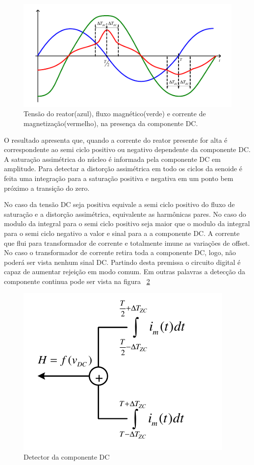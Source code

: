 \documentclass[paper=a4, fontsize=11pt]{article}
\begin{document}
\begin{figure}[!ht]
	\centering
	\includegraphics[scale=.8]{fig2.png}
    \caption{Tensão do reator(azul), fluxo magnético(verde) e corrente de magnetização(vermelho), na presença da componente DC.}
    \label{fig:figura2}
\end{figure}

O resultado apresenta que, quando a corrente do reator presente for alta é correspondente
ao semi ciclo positivo ou negativo dependente da componente DC. A saturação assimétrica
do núcleo é informada pela componente DC em amplitude. Para detectar a distorção
assimétrica em todo os ciclos da senoide é feita uma integração para a saturação positiva
e negativa em um ponto bem próximo a transição do zero.

No caso da tensão DC seja positiva equivale a semi ciclo positivo do fluxo de saturação e
a distorção assimétrica, equivalente as harmônicas pares. No caso do modulo da integral
para o semi ciclo positivo seja maior que o modulo da integral para o semi ciclo negativo
a valor e sinal para a a componente DC. A corrente que flui para transformador de
corrente e totalmente imune as variações de offset. No caso o transformador de corrente
retira toda a componente DC, logo, não poderá ser vista nenhum sinal DC. Partindo desta
premissa o circuito digital é capaz de aumentar rejeição em modo comum.
Em outras palavras a detecção da componente continua pode ser vista na figura ~\ref{fig:figura3}

\begin{figure}[!ht]
	\centering
	\includegraphics[scale=.8]{fig3.png}
    \caption{Detector da componente DC}
    \label{fig:figura3}
\end{figure}
\end{document}
